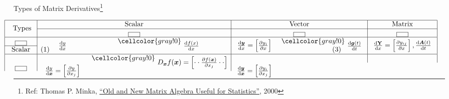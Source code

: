 \documentclass[12pt,thmsa]{article}
\begin{document}
\newpage
\begin{center}
	Types of Matrix Derivatives\footnote{Ref: Thomas P. Minka, \href{https://tminka.github.io/papers/matrix/minka-matrix.pdf}{``Old and New Matrix Algebra Useful for Statistics''}, 2000}
\end{center}
\[
\noindent\hspace*{-0.8cm}%
\begin{aligned}
	\begin{array}{|c|cc|cc|c|}
		\hline
		\multirow{2}{*}{ \text { Types }} & \multicolumn{2}{c|}{\text{Scalar}} & \multicolumn{2}{c|}{\text{Vector}} & \multicolumn{1}{c|}{\text{Matrix}} \\  %
		\cline{2-6} & \multicolumn{2}{c|}{\fbox{\vspace{1em}\hspace{1em}}} & \multicolumn{2}{c|}{\fbox{\vspace{1em}\hspace{1em}}} & \multicolumn{1}{c|}{\fbox{\vspace{1em}\hspace{1em}}} \\ %
		\hline
		\fbox{\vspace{1em}\hspace{1em}}
		& \multirow{2}{*}{ \( \frac{\mathrm{d} y}{\mathrm{d} x} \) }  
		& \cellcolor{gray!0}\multirow{2}{*}{ \( \frac{\mathrm{d} f(x)}{\mathrm{d} x} \) } 
		& \multirow{2}{*}{ \( \frac{\mathrm{d} \boldsymbol{y}}{\mathrm{d} x}=\left[\frac{\partial y_i}{\partial x}\right] \) }
		& \cellcolor{gray!0} \multirow{2}{*}{ \( \frac{\mathrm{d}  \boldsymbol{g}(t)}{\mathrm{d} t} \) }
		& \multirow{2}{*}{ \(\frac{\mathrm{d} \mathbf{Y}}{\mathrm{d} x}=\left[\frac{\partial y_{i j}}{\partial x}\right], \frac{\mathrm{d}  \boldsymbol{A}(t)}{\mathrm{d} t}\) }\\  %
		\cline{1-1} \text{Scalar} & (1) \qquad \qquad \quad & & & \qquad \qquad (3) &  \\  %
		\hline 
		 & &  \cellcolor{gray!0} \multirow{2}{*}{ \(D_{\boldsymbol{x}} f(\boldsymbol{x}) =\left[ \cdot \cdot \frac{\partial f(\boldsymbol{x})}{\partial x_j} \cdot \cdot \right] \)}  & & & \\  %
		\fbox{\vspace{1em}\hspace{1em}} & \multirow{2}{*}{ \(\frac{\mathrm{d} y}{\mathrm{d} \boldsymbol{x}}=\left[\frac{\partial y}{\partial x_j}\right]\) }
		& & \multirow{2}{*}{ \( \frac{\mathrm{d} \boldsymbol{y}}{\mathrm{d} \boldsymbol{x}}=\left[\frac{\partial y_i}{\partial x_j}\right]\) }

\end{array}
\end{aligned}\]
\end{document}
